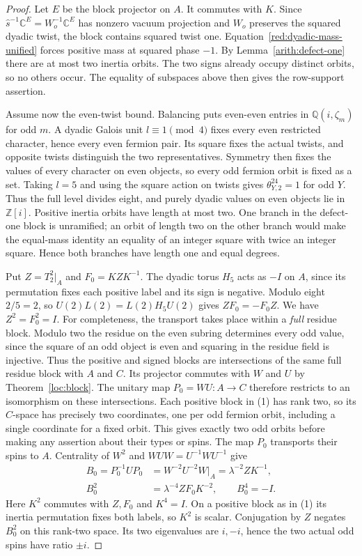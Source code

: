 \documentclass[11pt,a4paper]{article}
\numberwithin{equation}{section}
\begin{document}
\begin{proof}
Let $E$ be the block projector on $A$. It commutes with $K$.
Since $\widehat s^{-1}\mathbb C^E=W_o^{-1}\mathbb C^E$
has nonzero vacuum projection and $W_o$ preserves the squared
dyadic twist, the block contains squared twist one.
Equation~\eqref{red:dyadic-mass-unified} forces positive mass at squared
phase $-1$. By Lemma~\ref{arith:defect-one} there are at most
two inertia orbits. The two signs already occupy distinct orbits,
so no others occur. The equality of subspaces above then gives
the row-support assertion.

Assume now the even-twist bound. Balancing puts even-even entries
in $\mathbb Q(i,\zeta_m)$ for odd $m$. A dyadic Galois unit
$l\equiv1\pmod4$ fixes every even restricted character, hence
every even fermion pair. Its square fixes the actual twists, and
opposite twists distinguish the two representatives. Symmetry
then fixes the values of every character on even objects, so
every odd fermion orbit is fixed as a set. Taking $l=5$ and using
the square action on twists gives $\theta_{Y,2}^{24}=1$ for odd
$Y$. Thus the full level divides eight, and purely dyadic values
on even objects lie in $\mathbb Z[i]$. Positive inertia orbits
have length at most two. One branch in the defect-one block is
unramified; an orbit of length two on the other branch would make
the equal-mass identity an equality of an integer square with
twice an integer square. Hence both branches have length one
and equal degrees.

Put $Z=T_2^2|_A$ and $F_0=KZK^{-1}$. The dyadic torus $H_5$ acts as
$-I$ on $A$, since its permutation fixes each positive label and its sign
is negative. Modulo eight $2/5=2$, so $U(2)L(2)=L(2)H_5U(2)$ gives
$ZF_0=-F_0Z$. We have $Z^2=F_0^2=I$.
For completeness, the transport takes place within a \emph{full} residue
block. Modulo two the residue on the even subring determines every odd
value, since the square of an odd object is even and squaring in the
residue field is injective. Thus the positive and signed blocks are
intersections of the same full residue block with $A$ and $C$.
Its projector commutes with $W$ and $U$ by Theorem~\ref{loc:block}.
The unitary map $P_0=WU:A\to C$ therefore restricts to an isomorphism
on these intersections. Each positive block in (1) has rank two, so its
$C$-space has precisely two coordinates, one per odd fermion orbit,
including a single coordinate for a fixed orbit. This gives exactly two
odd orbits before making any assertion about their types or spins.
The map $P_0$ transports their spins to $A$.
Centrality of $W^2$ and $WUW=U^{-1}WU^{-1}$ give
\begin{align*}
 B_0=P_0^{-1}UP_0
 &=W^{-2}U^{-2}W|_A=\lambda^{-2} ZK^{-1},\\
 B_0^2&=\lambda^{-4} ZF_0 K^{-2},\qquad B_0^4=-I .
\end{align*}
Here $K^2$ commutes with $Z,F_0$ and $K^4=I$. On a positive block as
in (1) its inertia permutation fixes both labels, so $K^2$ is scalar.
Conjugation by $Z$ negates $B_0^2$ on this rank-two space. Its two
eigenvalues are $i,-i$, hence the two actual odd spins have ratio $\pm i$.


\end{proof}
\end{document}
